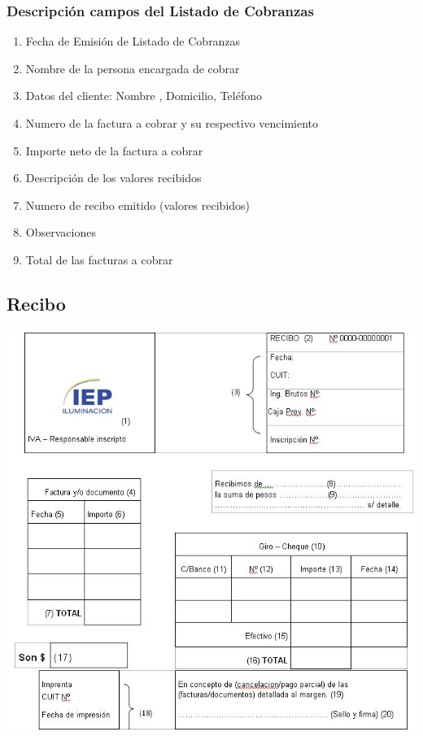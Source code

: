 \subsubsection{Descripci\'on campos del Listado de Cobranzas}
\begin{enumerate}
\item Fecha de Emisión de Listado de Cobranzas
\item Nombre de la persona encargada de cobrar
\item Datos del cliente: Nombre , Domicilio, Teléfono
\item Numero de la factura a cobrar y su respectivo vencimiento
\item Importe neto de la factura a cobrar
\item Descripción de los valores recibidos
\item Numero de recibo emitido (valores recibidos)
\item Observaciones
\item Total de las facturas a cobrar
\end{enumerate}

\pagebreak
\subsection{Recibo}
\begin{center}
  \includegraphics[scale=0.6]{./Images/FormulariosIEP/recibo.jpg}
\end{center}

